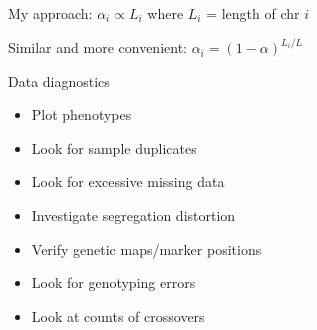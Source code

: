 \documentclass[12pt]{article}
\newcommand{\headsize}{\fontsize{35}{35} \selectfont}
\newcommand{\smallsize}{\fontsize{25}{30} \selectfont}
\begin{document}
\bigskip \bigskip \bigskip

{\color{myyellow} My approach: \hspace{1cm} $\alpha_i \propto L_i$}
\hspace{1cm} where $L_i$ = length of chr $i$

\bigskip \bigskip

\hspace*{1.5in} {\color{myblue} Similar and more convenient:  $\alpha_i = (1-\alpha)^{L_i/L}$}




\newpage

\headsize \color{myyellow}
\hfill \begin{minipage}{5.75in}
\centering
Data diagnostics
\end{minipage}

\vspace{3cm}

\color{mywhite} \smallsize

\hfill \begin{minipage}[t]{9.5in}
\begin{itemize}
\itemsep18pt
\item Plot phenotypes
\item Look for sample duplicates
\item Look for excessive missing data
\item Investigate segregation distortion
\item Verify genetic maps/marker positions
\item Look for genotyping errors
\item Look at counts of crossovers
\end{itemize} \end{minipage}
\end{document}
